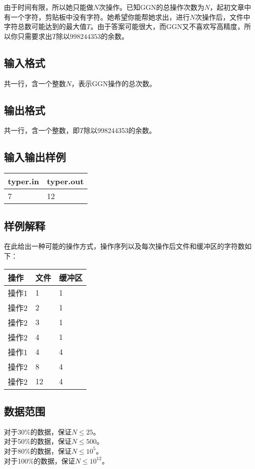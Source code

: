 \documentclass[12pt]{ctexart}
\begin{document}
由于时间有限，所以她只能做$N$次操作。已知GGN的总操作次数为$N$，起初文章中有一个字符，剪贴板中没有字符。她希望你能帮她求出，进行$N$次操作后，文件中字符总数可能达到的最大值$T$。由于答案可能很大，而GGN又不喜欢写高精度，所以你只需要求出$T$除以$998244353$的余数。
\subsection{输入格式}
共一行，含一个整数$N$，表示GGN操作的总次数。
\subsection{输出格式}
共一行，含一个整数，即$T$除以998244353的余数。
\subsection{输入输出样例}
\begin{center}
	\begin{tabular}{|p{6cm}|p{6cm}|}
		\hline typer.in&typer.out\\
		\hline7&12\\
		\hline
	\end{tabular}
\end{center}
\subsection{样例解释}
在此给出一种可能的操作方式，操作序列以及每次操作后文件和缓冲区的字符数如下：
\begin{center}
	\begin{tabular}{|p{4cm}|p{4cm}|p{4cm}|}
		\hline 操作&文件&缓冲区\\
		\hline 操作1&1&1\\
		\hline 操作2&2&1\\
		\hline 操作2&3&1\\
		\hline 操作2&4&1\\
		\hline 操作1&4&4\\
		\hline 操作2&8&4\\
		\hline 操作2&12&4\\
		\hline
	\end{tabular}
\end{center}
\subsection{数据范围}
\noindent 对于30\%的数据，保证$N\leq25$。\\
对于50\%的数据，保证$N\leq500$。\\
对于80\%的数据，保证$N\leq10^5$。\\
对于100\%的数据，保证$N\leq10^{12}$。
\end{document}
